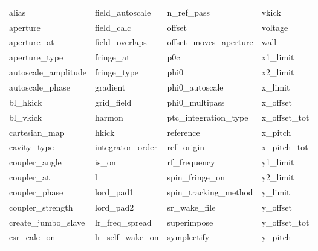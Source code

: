  \begin{tabular}{llll} \toprule
alias                       & field_autoscale             & n_ref_pass                  & vkick                       \\
aperture                    & field_calc                  & offset                      & voltage                     \\
aperture_at                 & field_overlaps              & offset_moves_aperture       & wall                        \\
aperture_type               & fringe_at                   & p0c                         & x1_limit                    \\
autoscale_amplitude         & fringe_type                 & phi0                        & x2_limit                    \\
autoscale_phase             & gradient                    & phi0_autoscale              & x_limit                     \\
bl_hkick                    & grid_field                  & phi0_multipass              & x_offset                    \\
bl_vkick                    & harmon                      & ptc_integration_type        & x_offset_tot                \\
cartesian_map               & hkick                       & reference                   & x_pitch                     \\
cavity_type                 & integrator_order            & ref_origin                  & x_pitch_tot                 \\
coupler_angle               & is_on                       & rf_frequency                & y1_limit                    \\
coupler_at                  & l                           & spin_fringe_on              & y2_limit                    \\
coupler_phase               & lord_pad1                   & spin_tracking_method        & y_limit                     \\
coupler_strength            & lord_pad2                   & sr_wake_file                & y_offset                    \\
create_jumbo_slave          & lr_freq_spread              & superimpose                 & y_offset_tot                \\
csr_calc_on                 & lr_self_wake_on             & symplectify                 & y_pitch                     \\

\end{tabular}

